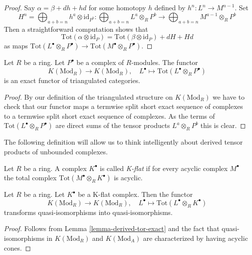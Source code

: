 \begin{proof}
Say $\alpha = \beta + dh + hd$ for some homotopy $h$ defined by
$h^n : L^n \to M^{n - 1}$. Set
$$
H^n = \bigoplus\nolimits_{a + b = n} h^a \otimes \text{id}_{P^b} :
\bigoplus\nolimits_{a + b = n} L^a \otimes_R P^b
\longrightarrow
\bigoplus\nolimits_{a + b = n} M^{a - 1} \otimes_R P^b
$$
Then a straightforward computation shows that
$$
\text{Tot}(\alpha \otimes \text{id}_P) =
\text{Tot}(\beta \otimes \text{id}_P) + dH + Hd
$$
as maps $\text{Tot}(L^\bullet \otimes_R P^\bullet) \to
\text{Tot}(M^\bullet \otimes_R P^\bullet)$.
\end{proof}

\begin{lemma}
\label{lemma-derived-tor-exact}
Let $R$ be a ring.
Let $P^\bullet$ be a complex of $R$-modules.
The functor
$$
K(\text{Mod}_R) \longrightarrow K(\text{Mod}_R), \quad
L^\bullet \longmapsto \text{Tot}(L^\bullet \otimes_R P^\bullet)
$$
is an exact functor of triangulated categories.
\end{lemma}

\begin{proof}
By our definition of the triangulated structure on
$K(\text{Mod}_R)$ we have to check that our functor maps
a termwise split short exact sequence of complexes to a termwise
split short exact sequence of complexes. As the terms of
$\text{Tot}(L^\bullet \otimes_R P^\bullet)$ are direct sums
of the tensor products $L^a \otimes_R P^b$ this is clear.
\end{proof}

\noindent
The following definition will allow us to think intelligently
about derived tensor products of unbounded complexes.

\begin{definition}
\label{definition-K-flat}
Let $R$ be a ring. A complex $K^\bullet$ is called {\it K-flat}
if for every acyclic complex $M^\bullet$ the total complex
$\text{Tot}(M^\bullet \otimes_R K^\bullet)$ is acyclic.
\end{definition}

\begin{lemma}
\label{lemma-K-flat-quasi-isomorphism}
Let $R$ be a ring. Let $K^\bullet$ be a K-flat complex.
Then the functor
$$
K(\text{Mod}_R) \longrightarrow K(\text{Mod}_R), \quad
L^\bullet \longmapsto \text{Tot}(L^\bullet \otimes_R K^\bullet)
$$
transforms quasi-isomorphisms into quasi-isomorphisms.
\end{lemma}

\begin{proof}
Follows from
Lemma \ref{lemma-derived-tor-exact}
and the fact that quasi-isomorphisms in $K(\text{Mod}_R)$ and
$K(\text{Mod}_A)$ are characterized by having acyclic cones.
\end{proof}

